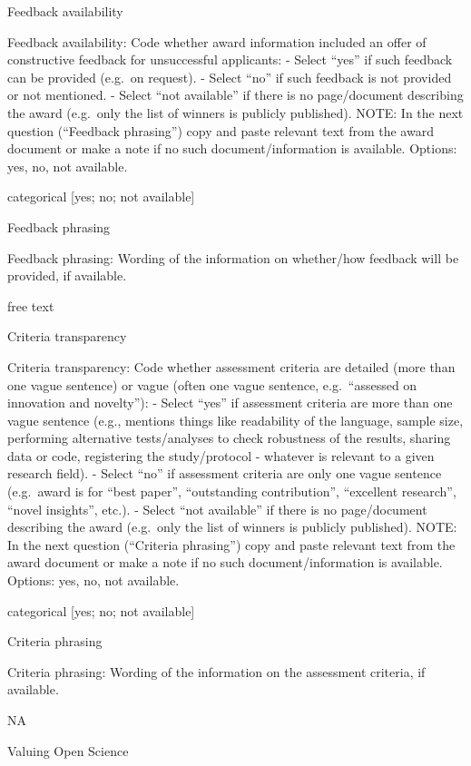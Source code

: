 \documentclass[
]{article}
\begin{document}
Feedback availability

Feedback availability: Code whether award information included an offer
of constructive feedback for unsuccessful applicants: - Select ``yes''
if such feedback can be provided (e.g.~on request). - Select ``no'' if
such feedback is not provided or not mentioned. - Select ``not
available'' if there is no page/document describing the award (e.g.~only
the list of winners is publicly published). NOTE: In the next question
(``Feedback phrasing'') copy and paste relevant text from the award
document or make a note if no such document/information is available.
Options: yes, no, not available.

categorical {[}yes; no; not available{]}

Feedback phrasing

Feedback phrasing: Wording of the information on whether/how feedback
will be provided, if available.

free text

Criteria transparency

Criteria transparency: Code whether assessment criteria are detailed
(more than one vague sentence) or vague (often one vague sentence,
e.g.~``assessed on innovation and novelty''): - Select ``yes'' if
assessment criteria are more than one vague sentence (e.g., mentions
things like readability of the language, sample size, performing
alternative tests/analyses to check robustness of the results, sharing
data or code, registering the study/protocol - whatever is relevant to a
given research field). - Select ``no'' if assessment criteria are only
one vague sentence (e.g.~award is for ``best paper'', ``outstanding
contribution'', ``excellent research'', ``novel insights'', etc.). -
Select ``not available'' if there is no page/document describing the
award (e.g.~only the list of winners is publicly published). NOTE: In
the next question (``Criteria phrasing'') copy and paste relevant text
from the award document or make a note if no such document/information
is available. Options: yes, no, not available.

categorical {[}yes; no; not available{]}

Criteria phrasing

Criteria phrasing: Wording of the information on the assessment
criteria, if available.

NA

Valuing Open Science
\end{document}
